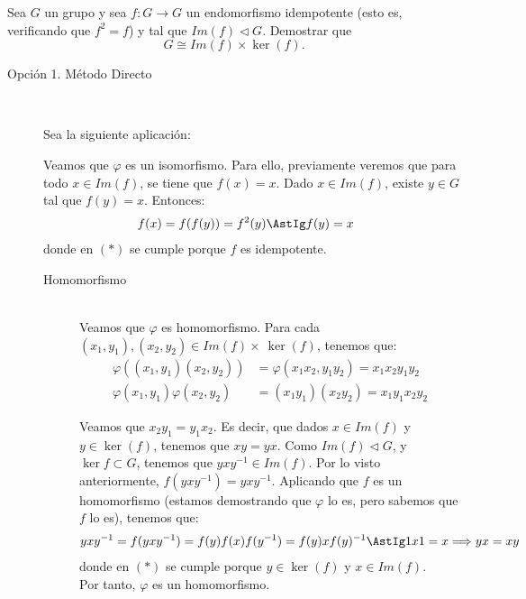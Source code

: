 \begin{ejercicio}
    Sea $G$ un grupo y sea $f:G\to G$ un endomorfismo idempotente (esto es, verificando que $f^2=f$) y tal que $Im(f)\lhd G$. Demostrar que
    \[
        G\cong Im(f)\times \ker(f).
    \]

    \begin{description}
        \item[Opción 1. Método Directo]~
        
        Sea la siguiente aplicación:

        Veamos que $\varphi$ es un isomorfismo. Para ello, previamente veremos que para todo $x\in Im(f)$, se tiene que $f(x)=x$. Dado $x\in Im(f)$, existe $y\in G$ tal que $f(y)=x$. Entonces:
        \begin{align*}
            f(x) &= f(f(y)) = f^2(y) \AstIg f(y) = x
        \end{align*}
        donde en $(\ast)$ se cumple porque $f$ es idempotente.

        \begin{description}
            \item [Homomorfismo]~\\
            Veamos que $\varphi$ es homomorfismo. Para cada $(x_1,y_1),(x_2,y_2)\in Im(f)\times~\ker(f)$, tenemos que:
            \begin{align*}
                \varphi((x_1,y_1)(x_2,y_2)) &= \varphi(x_1x_2,y_1y_2) = x_1x_2y_1y_2\\
                \varphi(x_1,y_1)\varphi(x_2,y_2) &= (x_1y_1)(x_2y_2) = x_1y_1x_2y_2
            \end{align*}

            Veamos que $x_2y_1 = y_1x_2$. Es decir, que dados $x\in Im(f)$ y $y\in \ker(f)$, tenemos que $xy=yx$. Como $Im(f)\lhd G$, y $\ker f \subset G$, tenemos que $yxy^{-1}\in Im(f)$. Por lo visto anteriormente, $f(yxy^{-1})=yxy^{-1}$. Aplicando que $f$ es un homomorfismo (estamos demostrando que $\varphi$ lo es, pero sabemos que $f$ lo es), tenemos que:
            \begin{align*}
                yxy^{-1} &= f(yxy^{-1}) = f(y)f(x)f(y^{-1}) = f(y) x f(y)^{-1} \AstIg 1x1 = x\Longrightarrow yx=xy
            \end{align*}
            donde en $(\ast)$ se cumple porque $y\in \ker(f)$ y $x\in Im(f)$.\\

            Por tanto, $\varphi$ es un homomorfismo.
            

\end{description}
\end{description}
\end{ejercicio}
